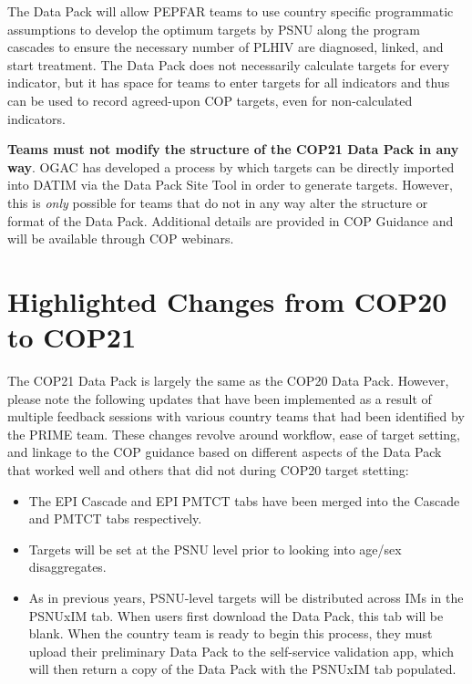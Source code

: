 \documentclass[
  openany]{book}
\begin{document}
The Data Pack will allow PEPFAR teams to use country specific
programmatic assumptions to develop the optimum targets by PSNU along
the program cascades to ensure the necessary number of PLHIV are
diagnosed, linked, and start treatment. The Data Pack does not
necessarily calculate targets for every indicator, but it has space for
teams to enter targets for all indicators and thus can be used to record
agreed-upon COP targets, even for non-calculated indicators.

\textbf{Teams must not modify the structure of the COP21 Data Pack in any
way}. OGAC has developed a process by which targets can be directly
imported into DATIM via the Data Pack Site Tool in order to generate
targets. However, this is \emph{only} possible for teams that do not in any
way alter the structure or format of the Data Pack. Additional details
are provided in COP Guidance and will be available through COP webinars.

\hypertarget{highlighted-changes-from-cop20-to-cop21}{%
\section{Highlighted Changes from COP20 to COP21}\label{highlighted-changes-from-cop20-to-cop21}}

The COP21 Data Pack is largely the same as the COP20 Data Pack. However,
please note the following updates that have been implemented as a result
of multiple feedback sessions with various country teams that had been
identified by the PRIME team. These changes revolve around workflow,
ease of target setting, and linkage to the COP guidance based on
different aspects of the Data Pack that worked well and others that did
not during COP20 target stetting:

\begin{itemize}
\item
  The EPI Cascade and EPI PMTCT tabs have been merged into the Cascade
  and PMTCT tabs respectively.
\item
  Targets will be set at the PSNU level prior to looking into age/sex
  disaggregates.
\item
  As in previous years, PSNU-level targets will be distributed across
  IMs in the PSNUxIM tab. When users first download the Data Pack,
  this tab will be blank. When the country team is ready to begin this
  process, they must upload their preliminary Data Pack to the
  self-service validation app, which will then return a copy of the
  Data Pack with the PSNUxIM tab populated.
\end{itemize}
\end{document}
